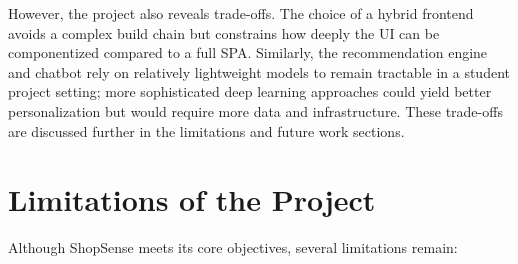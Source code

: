 However, the project also reveals trade-offs. The choice of a hybrid frontend avoids a complex build chain but constrains how deeply the UI can be componentized compared to a full SPA. Similarly, the recommendation engine and chatbot rely on relatively lightweight models to remain tractable in a student project setting; more sophisticated deep learning approaches could yield better personalization but would require more data and infrastructure. These trade-offs are discussed further in the limitations and future work sections.

\section{Limitations of the Project}

Although ShopSense meets its core objectives, several limitations remain:


